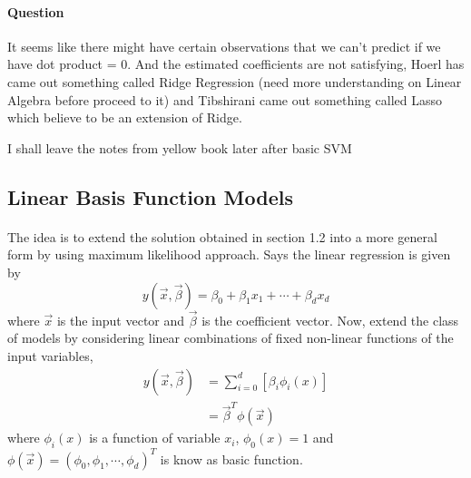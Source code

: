 \documentclass{article}
\begin{document}
\paragraph{Question}
It seems like there might have certain observations that we can't predict if we have dot product = 0. And the estimated coefficients are not satisfying, Hoerl has came out something called Ridge Regression (need more understanding on Linear Algebra before proceed to it) and Tibshirani came out something called Lasso which believe to be an extension of Ridge.

I shall leave the notes from yellow book later after basic SVM

\subsection{Linear Basis Function Models}
\paragraph{}
The idea is to extend the solution obtained in section 1.2 into a more general form by using maximum likelihood approach. Says the linear regression is given by
\begin{equation*}
    y(\Vec{x},\Vec{\beta}) = \beta_0 + \beta_1 x_1 + \cdots + \beta_d x_d
\end{equation*}
where $\Vec{x}$ is the input vector and $\Vec{\beta}$ is the coefficient vector. Now, extend the class of models by considering linear combinations of fixed non-linear functions of the input variables,
\begin{align}
    y(\Vec{x},\Vec{\beta}) &= \displaystyle\sum_{i=0}^{d}[\beta_i\phi_i(x)] \nonumber \\
    &= \Vec{\beta}^{T}\phi(\Vec{x})
\end{align}
where $\phi_i(x)$ is a function of variable $x_i$, $\phi_0(x)=1$ and $\phi(\Vec{x}) = (\phi_0,\phi_1,\cdots,\phi_d)^T$ is know as basic function.
\end{document}
